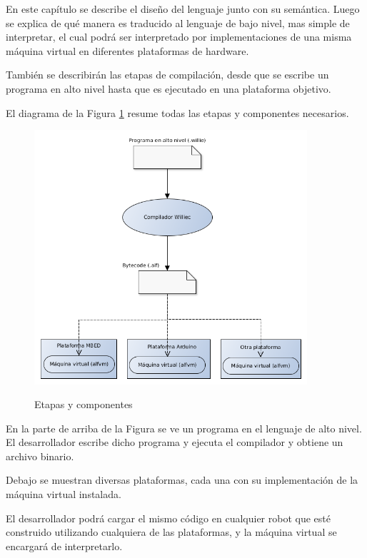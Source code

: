 

  En este capítulo se describe el diseño del lenguaje \frob{} junto con su semántica.
  Luego se explica de qué manera es traducido al lenguaje \alf{} de
bajo nivel, mas simple de interpretar, el cual podrá ser interpretado
por implementaciones de una misma máquina virtual en diferentes
plataformas de hardware.

  También se describirán las etapas de compilación, desde que se escribe
un programa en alto nivel hasta que es ejecutado en una
plataforma objetivo.

  El diagrama de la Figura \ref{fig:compilacion} resume todas las etapas y
componentes necesarios.

\begin{figure}[h]
\begin{center}
\caption{Etapas y componentes}
\includegraphics[width=0.9\textwidth]{graphs/compilacion.png}
\label{fig:compilacion}
\end{center}
\end{figure}

  En la parte de arriba de la Figura se ve un programa en el
lenguaje \frob{} de alto nivel.
  El desarrollador escribe dicho programa y
ejecuta el compilador \compilador{} y obtiene un archivo \alf{} binario.

  Debajo se muestran diversas plataformas, cada una
con su implementación de la máquina virtual \maquinavirtual{} instalada.

  El desarrollador podrá cargar el mismo código \alf{} en cualquier robot que
esté construido utilizando cualquiera de las plataformas, y la máquina
virtual se encargará de interpretarlo.
